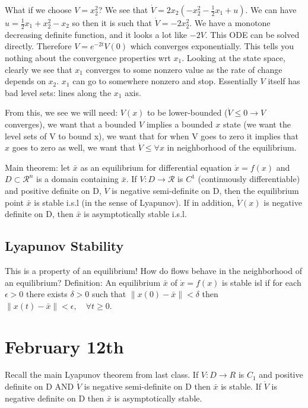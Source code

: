 \documentclass[11pt]{article}
\newcommand{\norm}[1]{\left\lVert#1\right\rVert}
\begin{document}
What if we choose $V = x_2^2$? We see that $\dot{V} = 2x_2(-x_2^2 -\frac{1}{2}x_1 + u)$. We can have $u = \frac{1}{2}x_1 + x_2^2 -x_2$ so then it is such that $\dot{V} = -2x_2^2$. We have a monotone decreasing definite function, and it looks a lot like $-2V$. This ODE can be solved directly. Therefore $V = e^{-2t}V(0)$ which converges exponentially. This tells you nothing about the convergence properties wrt $x_1$. Looking at the state space, clearly we see that $x_1$ converges to some nonzero value as the rate of change depends on $x_2$. $x_1$ can go to somewhere nonzero and stop. Essentially $V$ itself has bad level sets: lines along the $x_1$ axis. 

From this, we see we will need: $V(x)$ to be lower-bounded ($\dot{V}\leq 0 \rightarrow V$ converges), we want that a bounded $V$ implies a bounded $x$ state (we want the level sets of V to bound x), we want that for when V goes to zero it implies that $x$ goes to zero as well, we want that $\dot{V}\leq \forall x$ in neighborhood of the equilibrium. 

Main theorem: let $\bar{x}$ as an equilibrium for differential equation $\dot{x} = f(x)$ and $D \subset \mathcal{R}^n$ is a domain containing $\bar{x}$. If $V:D\rightarrow \mathcal{R}$ is $C^1$ (continuously differentiable) and positive definite on D, $\dot{V}$ is negative semi-definite on D, then the equilibrium point $\bar{x}$ is stable i.s.l (in the sense of Lyapunov). If in addition, $\dot{V}(x)$ is negative definite on D, then $\bar{x}$ is asymptotically stable i.s.l.

\subsection*{Lyapunov Stability}
This is a property of an equilibrium! How do flows behave in the neighborhood of an equilibrium? Definition: An equilibrium $\bar{x}$ of $\dot{x} = f(x)$ is stable isl if for each $\epsilon > 0$ there exists $\delta >0$ such that $\norm{x(0) - \bar{x}} < \delta$ then $\norm{ x(t) - \bar{x}} < \epsilon,\quad \forall t \geq 0$.




\section*{February 12th}
Recall the main Lyapunov theorem from last class. If $V:D\rightarrow R$ is $C_1$
and positive definite on D AND $\dot{V}$ is negative semi-definite on D then $\bar{x}$ is stable. If $\dot{V}$ is negative definite on D then $\bar{x}$ is asymptotically stable.
\end{document}
